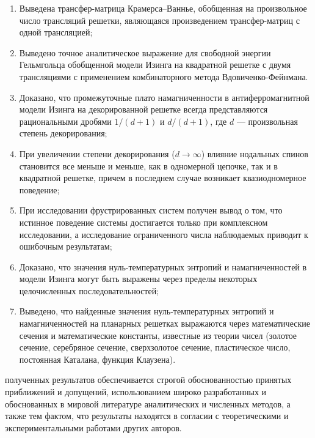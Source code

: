 {}
\begin{enumerate}[beginpenalty=10000] %
  \item Выведена трансфер-матрица Крамерса–Ваннье, обобщенная на произвольное число трансляций решетки, являющаяся произведением трансфер-матриц с одной трансляцией;
  \item Выведено точное аналитическое выражение для свободной энергии Гельмгольца обобщенной модели Изинга на квадратной решетке с двумя трансляциями с применением комбинаторного метода Вдовиченко-Фейнмана.
  \item Доказано, что промежуточные плато намагниченности в антиферромагнитной модели Изинга на декорированной решетке всегда представляются рациональными дробями $1/(d + 1)$ и $d/(d + 1)$, где $d$ --- произвольная степень декорирования;
  \item При увеличении степени декорирования ($d \rightarrow \infty$) влияние нодальных спинов становится все меньше и меньше, как в одномерной цепочке, так и в квадратной решетке, причем в последнем случае возникает квазиодномерное поведение;
  \item При исследовании фрустрированных систем получен вывод о том, что истинное поведение системы достигается только при комплексном исследовании, а исследование ограниченного числа наблюдаемых приводит к ошибочным результатам;
  \item Доказано, что значения нуль-температурных энтропий и намагниченностей в модели Изинга могут быть выражены через пределы некоторых целочисленных последовательностей;
  \item Выведено, что найденные значения нуль-температурных энтропий и намагниченностей на планарных решетках выражаются через математические сечения и математические константы, известные из теории чисел (золотое сечение, серебряное сечение, сверхзолотое сечение, пластическое число, постоянная Каталана, функция Клаузена). 
\end{enumerate}

{\reliability} полученных результатов обеспечивается строгой обоснованностью принятых приближений и допущений, использованием широко разработанных и обоснованных в мировой литературе аналитических и численных методов, а также тем фактом, что результаты находятся в согласии с теоретическими и экспериментальными работами других авторов.


